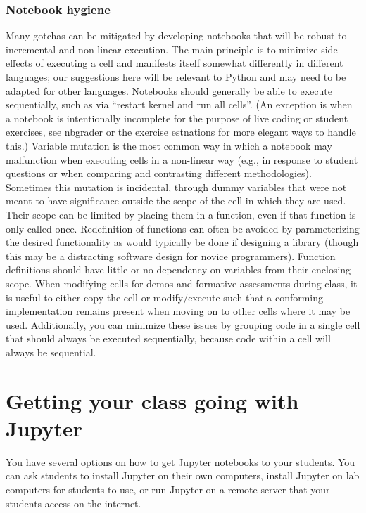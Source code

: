 \documentclass[]{book}
\begin{document}
\hypertarget{notebook-hygiene}{%
\subsection{Notebook hygiene}\label{notebook-hygiene}}

Many gotchas can be mitigated by developing notebooks that will be
robust to incremental and non-linear execution. The main principle is
to minimize side-effects of executing a cell and manifests itself
somewhat differently in different languages; our suggestions here will
be relevant to Python and may need to be adapted for other
languages. Notebooks should generally be able to execute sequentially,
such as via ``restart kernel and run all cells''. (An exception is when
a notebook is intentionally incomplete for the purpose of live coding
or student exercises, see nbgrader or the exercise estnations for more
elegant ways to handle this.) Variable mutation is the most common way
in which a notebook may malfunction when executing cells in a
non-linear way (e.g., in response to student questions or when
comparing and contrasting different methodologies). Sometimes this
mutation is incidental, through dummy variables that were not meant to
have significance outside the scope of the cell in which they are
used. Their scope can be limited by placing them in a function, even
if that function is only called once. Redefinition of functions can
often be avoided by parameterizing the desired functionality as would
typically be done if designing a library (though this may be a
distracting software design for novice programmers). Function
definitions should have little or no dependency on variables from
their enclosing scope. When modifying cells for demos and formative
assessments during class, it is useful to either copy the cell or
modify/execute such that a conforming implementation remains present
when moving on to other cells where it may be used. Additionally, you
can minimize these issues by grouping code in a single cell that
should always be executed sequentially, because code within a cell
will always be sequential.

\hypertarget{getting-going}{%
\chapter{Getting your class going with Jupyter}\label{getting-going}}

You have several options on how to get Jupyter notebooks to your
students. You can ask students to install Jupyter on their own
computers, install Jupyter on lab computers for students to use, or
run Jupyter on a remote server that your students access on the
internet.
\end{document}
